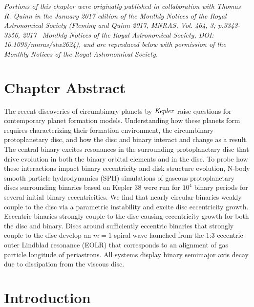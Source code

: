 \textit{Portions of this chapter were originally published in collaboration with Thomas R. Quinn in the January 2017 edition of the Monthly Notices of the Royal Astronomical Society (Fleming and Quinn 2017, MNRAS, Vol. 464, 3; p.3343-3356, 2017 \textcopyright \ Monthly Notices of the Royal Astronomical Society, DOI: 10.1093/mnras/stw2624), and are reproduced below with permission of the Monthly Notices of the Royal Astronomical Society.}

\section{Chapter Abstract}
The recent discoveries of circumbinary planets by $\it Kepler$ raise questions for contemporary planet formation
models.  Understanding how these planets form requires characterizing their formation environment, the circumbinary protoplanetary disc,
and how the disc and binary interact and change as a result.  The central binary excites resonances in the surrounding
protoplanetary disc that drive evolution in both the binary orbital elements and in the
disc.  To probe how these interactions impact binary eccentricity and disk structure evolution, N-body smooth particle
hydrodynamics (SPH) simulations of gaseous protoplanetary discs
surrounding binaries based on Kepler 38 were run for $10^4$ binary
periods for several initial binary eccentricities.  We find that
nearly circular binaries weakly couple to the disc via a parametric
instability and excite disc eccentricity growth.  Eccentric binaries strongly couple to the disc
causing eccentricity growth for both the disc and binary.
Discs around sufficiently eccentric binaries that strongly couple to the disc develop an
$m = 1$ spiral wave launched from the 1:3 eccentric outer Lindblad
resonance (EOLR) that corresponds to an alignment of gas
particle longitude of periastrons. All systems display binary semimajor axis decay due to dissipation from the
viscous disc. 

\section{Introduction}

